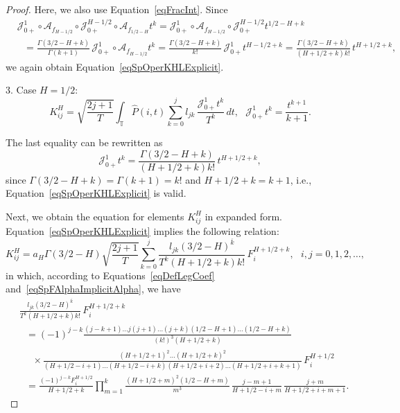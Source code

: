 \documentclass[10pt,a4paper]{amsart}
\newcommand{\ca}{\mathcal{A}}
\newcommand{\cj}{\mathcal{J}}
\begin{document}
\begin{proof}
Here, we also use Equation~\eqref{eqFracInt}. Since
\begin{align*}
  & \cj_{0+}^1 \circ \ca_{f_{H-1/2}} \circ \cj_{0+}^{H-1/2} \circ \ca_{f_{1/2-H}} t^k = \cj_{0+}^1 \circ \ca_{f_{H-1/2}} \circ \cj_{0+}^{H-1/2} t^{1/2-H+k} \\
  & \ \ \ = \frac{\Gamma(3/2-H+k)}{\Gamma(k+1)} \, \cj_{0+}^1 \circ \ca_{f_{H-1/2}} t^k = \frac{\Gamma(3/2-H+k)}{k!} \, \cj_{0+}^1 t^{H-1/2+k} = \frac{\Gamma(3/2-H+k)}{(H+1/2+k) k!} \, t^{H+1/2+k},
\end{align*}
we again obtain Equation~\eqref{eqSpOperKHLExplicit}.

3. Case $H = 1/2$:
\[
  K_{ij}^H = \sqrt{\frac{2j+1}{T}} \int_\mathds{T} {\hat P(i,t) \sum\limits_{k=0}^j {l_{jk} \, \frac{\cj_{0+}^1 t^k}{T^k}} \, dt}, \ \ \ \cj_{0+}^1 t^k = \frac{t^{k+1}}{k+1}.
\]

The last equality can be rewritten as
\[
  \cj_{0+}^1 t^k = \frac{\Gamma(3/2-H+k)}{(H+1/2+k) k!} \, t^{H+1/2+k},
\]
since $\Gamma(3/2-H+k) = \Gamma(k+1) = k!$ and $H+1/2+k = k+1$, i.e., Equation~\eqref{eqSpOperKHLExplicit} is valid.

Next, we obtain the equation for elements $K_{ij}^H$ in expanded form. Equation~\eqref{eqSpOperKHLExplicit} implies the following relation:
\[
  K_{ij}^H = a_H \Gamma(3/2-H) \sqrt{\frac{2j+1}{T}} \sum\limits_{k=0}^j \frac{l_{jk} (3/2-H)^{\overline{k}}}{T^k (H+1/2+k) k!} \, F_i^{H+1/2+k}, \ \ \ i,j = 0,1,2,\dots,
\]
in which, according to Equations~\eqref{eqDefLegCoef} and~\eqref{eqSpFAlphaImplicitAlpha}, we have
\begin{align*}
  & \frac{l_{jk} (3/2-H)^{\overline{k}}}{T^k (H+1/2+k) k!} \, F_i^{H+1/2+k} \\
  & \ \ \ = (-1)^{j-k} \frac{(j-k+1) \ldots j(j+1) \ldots (j+k) (1/2-H+1) \ldots (1/2-H+k)}{(k!)^3 (H+1/2+k)} \\
  & \ \ \ \ \ \ {} \times \frac{(H+1/2+1)^2 \dots (H+1/2+k)^2}{(H+1/2-i+1) \dots (H+1/2-i+k) (H+1/2+i+2) \dots (H+1/2+i+k+1)} \, F_i^{H+1/2} \\
  & \ \ \ = \frac{(-1)^{j-k} F_i^{H+1/2}}{H+1/2+k} \prod\limits_{m=1}^k \frac{(H+1/2+m)^2 (1/2-H+m)}{m^3} \, \frac{j-m+1}{H+1/2-i+m} \, \frac{j+m}{H+1/2+i+m+1}.
\end{align*}


\end{proof}
\end{document}

